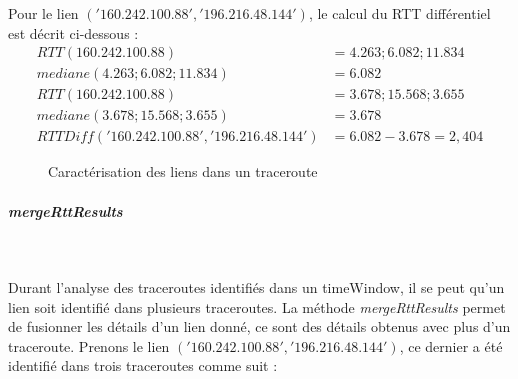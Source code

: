    Pour le lien $ ('160.242.100.88', '196.216.48.144') $,  le calcul du RTT différentiel est décrit ci-dessous : 
    	\begin{align*}
    	RTT(160.242.100.88) & = 4.263; 6.082; 11.834 \\ 
    	mediane (4.263; 6.082; 11.834)&=  6.082 \\
    	RTT(160.242.100.88) &= 3.678; 15.568; 3.655\\
    	mediane(3.678; 15.568; 3.655)&= 3.678 \\
    	RTT Diff ('160.242.100.88', '196.216.48.144') &=  6.082 - 3.678  = 2,404
    	\end{align*}


    \begin{landscape}
    	\begin{figure}[H]
    		\centering
    		\resizebox{20cm}{!}{
    			 
    		}
    		\caption{Caractérisation des liens dans un traceroute}
    		\label{fig:computertt}
    	\end{figure}
    \end{landscape}



  \subparagraph{mergeRttResults}~
  
  Durant l'analyse des traceroutes identifiés dans un timeWindow, il se peut qu'un lien soit identifié dans plusieurs traceroutes. La méthode \textit{mergeRttResults} permet de fusionner les détails d'un lien donné, ce sont des détails obtenus avec plus d'un traceroute. Prenons le lien $('160.242.100.88', '196.216.48.144')$, ce dernier a été  identifié dans trois traceroutes comme suit :
  
  
  
  \begin{table}[H]
  \caption{Exemple de traceroute : 1}
  \label{tab:trace1}
  \end{table}
  
